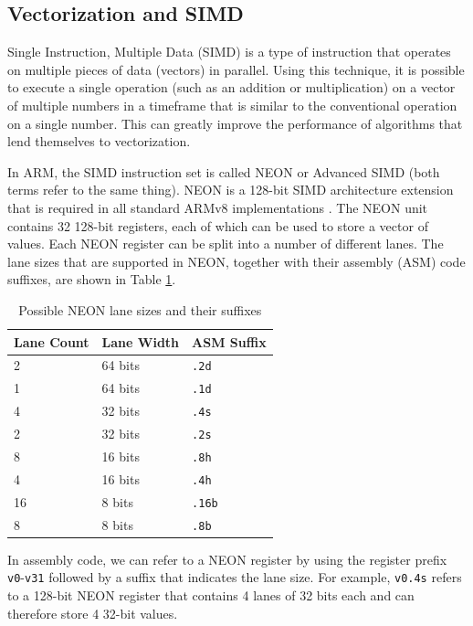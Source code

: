 \documentclass[11pt,a4paper]{report}
\theoremstyle{definition}
\begin{document}
\subsection{Vectorization and SIMD}
\label{sec:simd}
Single Instruction, Multiple Data (SIMD) is a type of instruction that operates on multiple pieces of data (vectors) in parallel. Using this technique, it is possible to execute a single operation (such as an addition or multiplication) on a vector of multiple numbers in a timeframe that is similar to the conventional operation on a single number. This can greatly improve the performance of algorithms that lend themselves to vectorization.

In ARM, the SIMD instruction set is called NEON or Advanced SIMD (both terms refer to the same thing). NEON is a 128-bit SIMD architecture extension that is required in all standard ARMv8 implementations \cite{ARMv8A-ProgrammersGuide}. The NEON unit contains 32 128-bit registers, each of which can be used to store a vector of values. Each NEON register can be split into a number of different lanes. The lane sizes that are supported in NEON, together with their assembly (ASM) code suffixes, are shown in Table \ref{tab:neonlanes}.

\begin{table}
  \centering
  \begin{tabular}{lll}
    \toprule
    \textbf{Lane Count} & \textbf{Lane Width} & \textbf{ASM Suffix} \\
    \midrule
    2 & 64 bits & \texttt{.2d} \\
    1 & 64 bits & \texttt{.1d} \\
    4 & 32 bits & \texttt{.4s} \\
    2 & 32 bits & \texttt{.2s} \\
    8 & 16 bits & \texttt{.8h} \\
    4 & 16 bits & \texttt{.4h} \\
    16 & 8 bits & \texttt{.16b} \\
    8 & 8 bits & \texttt{.8b} \\
    \bottomrule
  \end{tabular}
  \caption{Possible NEON lane sizes and their suffixes}
  \label{tab:neonlanes}
\end{table}

In assembly code, we can refer to a NEON register by using the register prefix \texttt{v0}-\texttt{v31} followed by a suffix that indicates the lane size. For example, \texttt{v0.4s} refers to a 128-bit NEON register that contains 4 lanes of 32 bits each and can therefore store 4 32-bit values.
\end{document}

